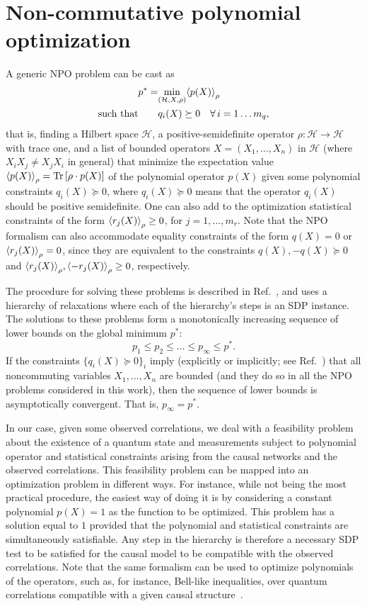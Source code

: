 \documentclass[superscriptaddress,aps,prx,nofootinbib,twocolumn,twoside,reprint,letterpaper,longbibliography]{revtex4-2}
\DeclarePairedDelimiter{\expec}{\langle}{\rangle}
\DeclareMathOperator{\Tr}{Tr}
\begin{document}
\section{Non-commutative polynomial optimization}
\label{app_npo}
A generic NPO problem can be cast as
\begin{align*}
    p^* =& \underset{(\mathcal{H},X,\rho)}{\min}  \expec*{p(X)}_\rho \\
    \text{such that} \qquad& q_i(X)\succeq 0\quad\forall\,i=1\dots m_q,
\end{align*}
that is, finding a Hilbert space $\mathcal{H}$, a positive-semidefinite operator $\rho:\mathcal{H}\rightarrow\mathcal{H}$ with trace one, and a list of bounded operators $X=(X_1,\dots, X_n)$ in $\mathcal{H}$ (where \mbox{$X_iX_j\neq X_jX_i$} in general) that minimize the expectation value $\expec*{p(X)}_\rho=\Tr\left[\rho\cdot p(X)\right]$ of the polynomial operator $p(X)$ given some polynomial constraints $q_i(X)\succeq 0$, where $q_i(X)\succeq 0$ means that the operator $q_i(X)$ should be positive semidefinite.
One can also add to the optimization statistical constraints of the form $\expec*{r_j(X)}_\rho \geq 0$, for $j=1,\ldots, m_r$.
Note that the NPO formalism can also accommodate equality constraints of the form $q(X)= 0$ or $\expec*{r_j(X)}_\rho = 0$, since they are equivalent to the constraints $q(X),-q(X)\succeq 0$ and $\expec*{r_j(X)}_\rho,\expec*{-r_j(X)}_\rho\geq 0$, respectively.

The procedure for solving these problems is described in Ref.~\cite{npo}, and uses a hierarchy of relaxations where each of the hierarchy's steps is an SDP instance.
The solutions to these problems form a monotonically increasing sequence of lower bounds on the global minimum $p^*$:
\begin{equation*}
    p_1\leq p_2\leq\dots\leq p_\infty\leq p^*.
\end{equation*}
If the constraints $\{q_i(X)\succeq 0\}_i$ imply (explicitly or implicitly; see Ref.~\cite{npo}) that all noncommuting variables $X_1,\dots,X_n$ are bounded (and they do so in all the NPO problems considered in this work), then the sequence of lower bounds is asymptotically convergent. That is, $p_\infty=p^*$.

In our case, given some observed correlations, we deal with a feasibility problem about the existence of a quantum state and measurements subject to polynomial operator and statistical constraints arising from the causal networks and the observed correlations. This feasibility problem can be mapped into an optimization problem in different ways. For instance, while not being the most practical procedure, the easiest way of doing it is by considering a constant polynomial $p(X)=1$ as the function to be optimized. This problem has a solution equal to $1$ provided that the polynomial and statistical constraints are simultaneously satisfiable. Any step in the hierarchy is therefore a necessary SDP test to be satisfied for the causal model to be compatible with the observed correlations. Note that the same formalism can be used to optimize polynomials of the operators, such as, for instance, Bell-like inequalities, over quantum correlations compatible with a given causal structure~\cite{Schmid2020LOSR}.
\end{document}
